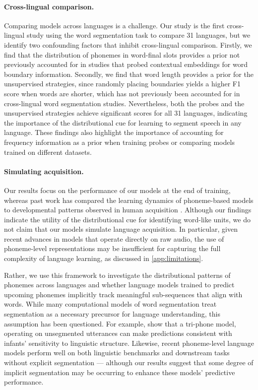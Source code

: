 \paragraph{Cross-lingual comparison.} Comparing models across languages is a challenge. Our study is the first cross-lingual study using the word segmentation task to compare 31 languages, but we identify two confounding factors that inhibit cross-lingual comparison. Firstly, we find that the distribution of phonemes in word-final slots provides a prior not previously accounted for in studies that probed contextual embeddings for word boundary information. Secondly, we find that word length provides a prior for the unsupervised strategies, since randomly placing boundaries yields a higher F1 score when words are shorter, which has not previously been accounted for in cross-lingual word segmentation studies. Nevertheless, both the probes and the unsupervised strategies achieve significant scores for all 31 languages, indicating the importance of the distributional cue for learning to segment speech in any language. These findings also highlight the importance of accounting for frequency information as a prior when training probes or comparing models trained on different datasets.

\paragraph{Simulating acquisition.} Our results focus on the performance of our models at the end of training, whereas past work has compared the learning dynamics of phoneme-based models to developmental patterns observed in human acquisition \citep{kirov-2018-recurrent}. Although our findings indicate the utility of the distributional cue for identifying word-like units, we do not claim that our models simulate language acquisition. In particular, given recent advances in models that operate directly on raw audio, the use of phoneme-level representations may be insufficient for capturing the full complexity of language learning, as discussed in \cref{app:limitations}.

Rather, we use this framework to investigate the distributional patterns of phonemes across languages and whether language models trained to predict upcoming phonemes implicitly track meaningful sub-sequences that align with words. While many computational models of word segmentation treat segmentation as a necessary precursor for language understanding, this assumption has been questioned. For example, \citet{Baayen02012016} show that a tri-phone model, operating on unsegmented utterances can make predictions consistent with infants' sensitivity to linguistic structure. Likewise, recent phoneme-level language models perform well on both linguistic benchmarks and downstream tasks without explicit segmentation \citep{goriely2024babble} --- although our results suggest that some degree of implicit segmentation may be occurring to enhance these models' predictive performance. 

